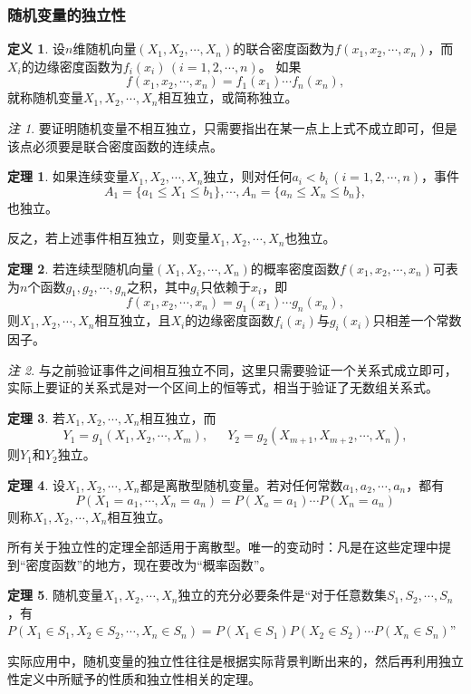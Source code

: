 \documentclass[a4paper,11pt]{article}%
\theoremstyle{remark}
\newtheorem*{remark}{注}
\theoremstyle{remark}
\theoremstyle{definition}
\newtheorem{theorem}{定理}[section]
\theoremstyle{definition}
\newtheorem*{definition}{定义}
\theoremstyle{plain}
\begin{document}
\subsubsection{随机变量的独立性}
\begin{definition}
    设$n$维随机向量$(X_1,X_2,\cdots,X_n)$的联合密度函数为$f(x_1,x_2,\cdots,x_n)$，而$X_i$的边缘密度函数为$f_i(x_i)\,(i=1,2,\cdots,n)$。
    如果 
    \[f(x_1,x_2,\cdots,x_n)=f_1(x_1)\cdots f_n(x_n),\]
    就称随机变量$X_1,X_2,\cdots,X_n$相互独立，或简称独立。
\end{definition}
\begin{remark}
    要证明随机变量不相互独立，只需要指出在某一点上上式不成立即可，但是该点必须要是联合密度函数的连续点。
\end{remark}
\begin{theorem}
    如果连续变量$X_1,X_2,\cdots,X_n$独立，则对任何$a_i<b_i\,(i=1,2,\cdots,n)$，事件 
    \[A_1=\{a_1\leq X_1\leq b_1\},\cdots,A_n=\{a_n\leq X_n\leq b_n\},\]
    也独立。 
    
    反之，若上述事件相互独立，则变量$X_1,X_2,\cdots,X_n$也独立。
\end{theorem}
\begin{theorem}
    若连续型随机向量$(X_1,X_2,\cdots,X_n)$的概率密度函数$f(x_1,x_2,\cdots,x_n)$可表为$n$个函数$g_1,g_2,\cdots,g_n$之积，其中$g_i$只依赖于$x_i$，即
    \[f(x_1,x_2,\cdots,x_n)=g_1(x_1)\cdots g_n(x_n),\]
    则$X_1,X_2,\cdots,X_n$相互独立，且$X_i$的边缘密度函数$f_i(x_i)$与$g_i(x_i)$只相差一个常数因子。
\end{theorem}
\begin{remark}
    与之前验证事件之间相互独立不同，这里只需要验证一个关系式成立即可，实际上要证的关系式是对一个区间上的恒等式，相当于验证了无数组关系式。
\end{remark}
\begin{theorem}
    若$X_1,X_2,\cdots,X_n$相互独立，而
    \[Y_1=g_1(X_1,X_2,\cdots,X_m),\phantom{111}Y_2=g_2(X_{m+1},X_{m+2},\cdots,X_n),\]
    则$Y_1$和$Y_2$独立。
\end{theorem}
\begin{theorem}
    设$X_1,X_2,\cdots,X_n$都是离散型随机变量。若对任何常数$a_1,a_2,\cdots,a_n$，都有
    \[P(X_1=a_1,\cdots,X_n=a_n)=P(X_a=a_1)\cdots P(X_n=a_n)\]
    则称$X_1,X_2,\cdots,X_n$相互独立。
\end{theorem}
所有关于独立性的定理全部适用于离散型。唯一的变动时：凡是在这些定理中提到“密度函数”的地方，现在要改为“概率函数”。
\begin{theorem}
    随机变量$X_1,X_2,\cdots,X_n$独立的充分必要条件是“对于任意数集$S_1,S_2,\cdots,S_n$，有$P(X_1\in S_1,X_2\in S_2,\cdots,X_n\in S_n)=P(X_1\in S_1)P(X_2\in S_2)\cdots P(X_n\in S_n)$”
\end{theorem}
实际应用中，随机变量的独立性往往是根据实际背景判断出来的，然后再利用独立性定义中所赋予的性质和独立性相关的定理。
\end{document}
